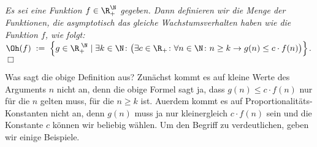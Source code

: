 \begin{Definition}[$\Oh(f)$] {\em
  Es sei eine Funktion $f\in \R_+^\N$ 
  gegeben.   Dann definieren wir die Menge der Funktionen, die asymptotisch
  das gleiche Wachstumsverhalten haben wie die Funktion $f$, wie folgt:
  \\[0.1cm]
  \hspace*{1.3cm} 
  $ \Oh(f) \;:=\; \left\{ g \in \R_+^{\;\N} \mid \exists k \in \N \colon 
    \bigl(\exists c \in \R_+\colon \forall n \in \N \colon n \geq k \rightarrow g(n) \leq c \cdot f(n)\bigr) \right\}$.
  \hspace*{\fill} $\Box$
}
\end{Definition}
Was sagt die obige Definition aus? Zun\"achst kommt es auf kleine Werte des Arguments $n$
nicht an, denn die obige Formel sagt ja, dass $g(n) \leq c \cdot f(n)$ nur f\"ur die $n$ gelten
muss, f\"ur die  $n \geq k$ ist.  Au\3erdem kommt es auf Proportionalit\"ats-Konstanten nicht
an, denn $g(n)$ muss ja nur kleinergleich $c \cdot f(n)$ sein und die Konstante $c$ k\"onnen wir
beliebig w\"ahlen.  Um den Begriff zu verdeutlichen, geben wir einige Beispiele.
\vspace*{0.3cm}

